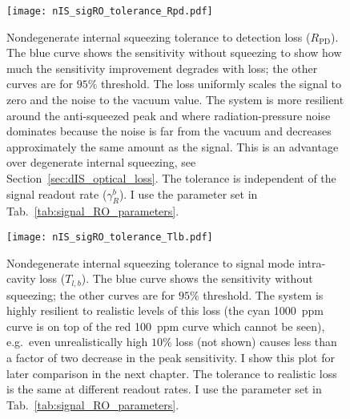 \begin{figure}
    \centering
    \texttt{[image: nIS\_sigRO\_tolerance\_Rpd.pdf]}
    \caption{ Nondegenerate internal squeezing tolerance to detection loss ($R_\text{PD}$). The blue curve shows the sensitivity without squeezing to show how much the sensitivity improvement degrades with loss; the other curves are for $95\%$ threshold. The loss uniformly scales the signal to zero and the noise to the vacuum value. The system is more resilient around the anti-squeezed peak and where radiation-pressure noise dominates because the noise is far from the vacuum and decreases approximately the same amount as the signal. This is an advantage over degenerate internal squeezing, see Section~\ref{sec:dIS_optical_loss}. The tolerance is independent of the signal readout rate ($\gamma^b_R$). I use the parameter set in Tab.~\ref{tab:signal_RO_parameters}.}
    \label{fig:nIS_sigRO_tolerance_Rpd}
\end{figure}
\begin{figure}[t]
    \centering
    \texttt{[image: nIS\_sigRO\_tolerance\_Tlb.pdf]}
    \caption{ Nondegenerate internal squeezing tolerance to signal mode intra-cavity loss ($T_{l,b}$). The blue curve shows the sensitivity without squeezing; the other curves are for $95\%$ threshold.
    The system is highly resilient to realistic levels of this loss (the cyan 1000~ppm curve is on top of the red 100~ppm curve which cannot be seen), e.g.\ even unrealistically high $10\%$ loss (not shown) causes less than a factor of two decrease in the peak sensitivity. I show this plot for later comparison in the next chapter. The tolerance to realistic loss is the same at different readout rates. I use the parameter set in Tab.~\ref{tab:signal_RO_parameters}.
    }
    \label{fig:nIS_sigRO_tolerance_Tlb}
\end{figure}
